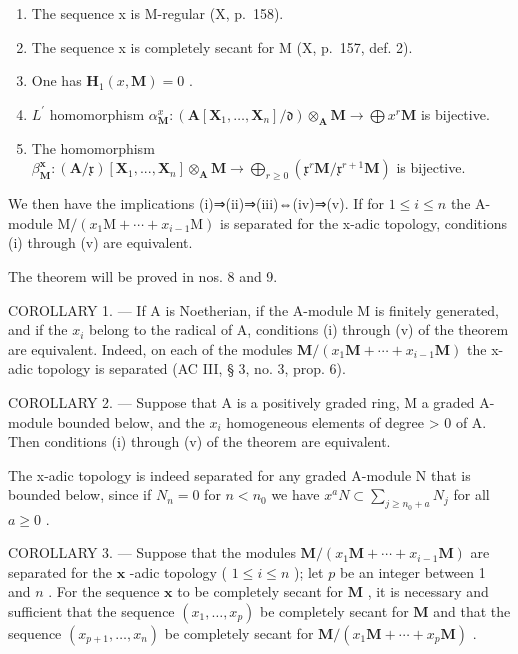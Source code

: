 \begin{enumerate}
\def\labelenumi{(\roman{enumi})}
\item
  The sequence x is M-regular (X, p.~158).
\item
  The sequence x is completely secant for M (X, p.~157, def. 2).
\item
  One has \(\mathbf{H}_1(x, \mathbf{M}) = 0\) .
\item
  \(L^{\prime}\) homomorphism \(\alpha_{\mathbf{M}}^{x}:(\mathbf{A}[\mathbf{X}_{1},\dots,\mathbf{X}_{n}]/\mathfrak{d})\otimes_{\mathbf{A}}\mathbf{M}\to\bigoplus x^{r}\mathbf{M}\) is bijective.
\item
  The homomorphism \(\beta_{\mathbf{M}}^{\mathbf{x}}:(\mathbf{A}/\mathfrak{x})[\mathbf{X}_{1},..., \mathbf{X}_{n}]\otimes_{\mathbf{A}}\mathbf{M}\to\bigoplus_{r\geqslant0}(\mathfrak{x}^{r}\mathbf{M}/\mathfrak{x}^{r+1}\mathbf{M})\) is bijective.
\end{enumerate}

We then have the implications (i)⇒(ii)⇒(iii)⇔(iv)⇒(v). If for \(1 \leqslant i \leqslant n\) the A-module \(\mathrm{M}/(x_{1}\mathrm{M} + \cdots + x_{i-1}\mathrm{M})\) is separated for the x-adic topology, conditions (i) through (v) are equivalent.

The theorem will be proved in nos. 8 and 9.

COROLLARY 1. --- If A is Noetherian, if the A-module M is finitely generated, and if the \(x_{i}\) belong to the radical of A, conditions (i) through (v) of the theorem are equivalent. Indeed, on each of the modules \(\mathbf{M}/(x_{1} \mathbf{M} + \cdots + x_{i-1} \mathbf{M})\) the x-adic topology is separated (AC III, § 3, no. 3, prop. 6).

COROLLARY 2. --- Suppose that A is a positively graded ring, M a graded A-module bounded below, and the \(x_i\) homogeneous elements of degree \textgreater{} 0 of A. Then conditions (i) through (v) of the theorem are equivalent.

The x-adic topology is indeed separated for any graded A-module N that is bounded below, since if \(N_{n}=0\) for \(n<n_{0}\) we have \(x^{a}N\subset\sum_{j\geqslant n_{0}+a}N_{j}\) for all \(a\geqslant0\) .

COROLLARY 3. --- Suppose that the modules \(\mathbf{M}/(x_1\mathbf{M} + \cdots + x_{i-1}\mathbf{M})\) are separated for the \(\mathbf{x}\) -adic topology ( \(1 \leqslant i \leqslant n\) ); let \(p\) be an integer between 1 and \(n\) . For the sequence \(\mathbf{x}\) to be completely secant for \(\mathbf{M}\) , it is necessary and sufficient that the sequence \((x_1, \ldots, x_p)\) be completely secant for \(\mathbf{M}\) and that the sequence \((x_{p+1}, \ldots, x_n)\) be completely secant for \(\mathbf{M}/(x_1\mathbf{M} + \cdots + x_p\mathbf{M})\) .

